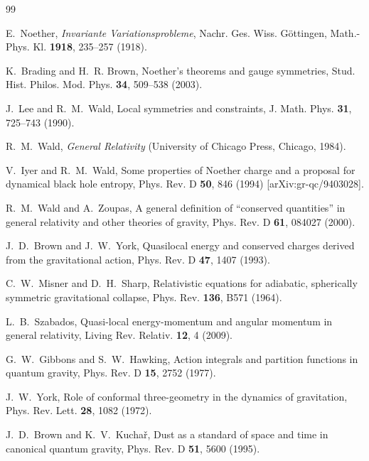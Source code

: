\documentclass[12pt,a4paper]{article}
\begin{document}

\begin{thebibliography}{99}

E.~Noether,
\emph{Invariante Variationsprobleme},
Nachr. Ges. Wiss. G\"ottingen, Math.-Phys. Kl. \textbf{1918}, 235--257 (1918).

K.~Brading and H.~R. Brown,
Noether's theorems and gauge symmetries,
Stud. Hist. Philos. Mod. Phys. \textbf{34}, 509--538 (2003).

J.~Lee and R.~M.~Wald,
Local symmetries and constraints,
J. Math. Phys. \textbf{31}, 725--743 (1990).

R.~M.~Wald,
\emph{General Relativity}
(University of Chicago Press, Chicago, 1984).

V.~Iyer and R.~M.~Wald,
Some properties of Noether charge and a proposal for dynamical black hole entropy,
Phys. Rev. D \textbf{50}, 846 (1994) [arXiv:gr-qc/9403028].

R.~M.~Wald and A.~Zoupas,
A general definition of ``conserved quantities'' in general relativity and other theories of gravity,
Phys. Rev. D \textbf{61}, 084027 (2000).

J.~D.~Brown and J.~W.~York,
Quasilocal energy and conserved charges derived from the gravitational action,
Phys. Rev. D \textbf{47}, 1407 (1993).

C.~W.~Misner and D.~H.~Sharp,
Relativistic equations for adiabatic, spherically symmetric gravitational collapse,
Phys. Rev. \textbf{136}, B571 (1964).

L.~B.~Szabados,
Quasi-local energy-momentum and angular momentum in general relativity,
Living Rev. Relativ. \textbf{12}, 4 (2009).

G.~W.~Gibbons and S.~W.~Hawking,
Action integrals and partition functions in quantum gravity,
Phys. Rev. D \textbf{15}, 2752 (1977).

J.~W.~York,
Role of conformal three-geometry in the dynamics of gravitation,
Phys. Rev. Lett. \textbf{28}, 1082 (1972).

J.~D.~Brown and K.~V.~Kucha\v{r},
Dust as a standard of space and time in canonical quantum gravity,
Phys. Rev. D \textbf{51}, 5600 (1995).


\end{thebibliography}
\end{document}
